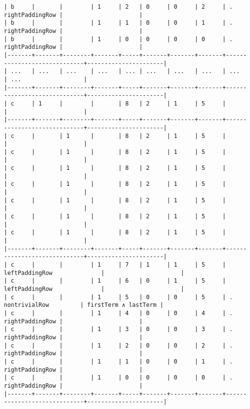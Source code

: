\documentclass[varwidth=\maxdimen,margin=0.5cm,multi={verbatim}]{standalone}
\begin{document}
\begin{verbatim}
| b     |       |        | 1     | 2   | 0     | 0     | 2     | .           rightPaddingRow |                      |
| b     |       |        | 1     | 1   | 0     | 0     | 1     | .           rightPaddingRow |                      |
| b     |       |        | 1     | 0   | 0     | 0     | 0     | .           rightPaddingRow |                      |
|-------+-------+--------+-------+-----+-------+-------+-------+-----------------------------+----------------------|
| ...   | ...   | ...    | ...   | ... | ...   | ...   | ...   | ...                         | ...                  |
|-------+-------+--------+-------+-----+-------+-------+-------+-----------------------------+----------------------|
| c     | 1     |        |       | 8   | 2     | 1     | 5     |                             |                      |
|-------+-------+--------+-------+-----+-------+-------+-------+-----------------------------+----------------------|
| c     |       | 1      |       | 8   | 2     | 1     | 5     |                             |                      |
| c     |       | 1      |       | 8   | 2     | 1     | 5     |                             |                      |
| c     |       | 1      |       | 8   | 2     | 1     | 5     |                             |                      |
| c     |       | 1      |       | 8   | 2     | 1     | 5     |                             |                      |
| c     |       | 1      |       | 8   | 2     | 1     | 5     |                             |                      |
| c     |       | 1      |       | 8   | 2     | 1     | 5     |                             |                      |
| c     |       | 1      |       | 8   | 2     | 1     | 5     |                             |                      |
|-------+-------+--------+-------+-----+-------+-------+-------+-----------------------------+----------------------|
| c     |       |        | 1     | 7   | 1     | 1     | 5     | leftPaddingRow              |                      |
| c     |       |        | 1     | 6   | 0     | 1     | 5     | leftPaddingRow              |                      |
| c     |       |        | 1     | 5   | 0     | 0     | 5     | .     nontrivialRow         | firstTerm ∧ lastTerm |
| c     |       |        | 1     | 4   | 0     | 0     | 4     | .           rightPaddingRow |                      |
| c     |       |        | 1     | 3   | 0     | 0     | 3     | .           rightPaddingRow |                      |
| c     |       |        | 1     | 2   | 0     | 0     | 2     | .           rightPaddingRow |                      |
| c     |       |        | 1     | 1   | 0     | 0     | 1     | .           rightPaddingRow |                      |
| c     |       |        | 1     | 0   | 0     | 0     | 0     | .           rightPaddingRow |                      |
|-------+-------+--------+-------+-----+-------+-------+-------+-----------------------------+----------------------|
\end{verbatim}
\end{document}
